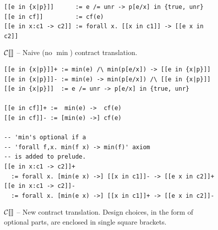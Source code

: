 \documentclass[preprint]{sigplanconf}
\begin{document}
\begin{figure}
\begin{verbatim}
[[e in {x|p}]]      := e /= unr -> p[e/x] in {true, unr}
[[e in cf]]         := cf(e)
[[e in x:c1 -> c2]] := forall x. [[x in c1]] -> [[e x in c2]]
\end{verbatim}
\caption{$\mathcal{C} \llbracket  \rrbracket$ -- Naive (no $\min$) contract translation.}
\label{fig:naiveCTrans}
\end{figure}

\begin{figure}
\begin{verbatim}
[[e in {x|p}]]+ := min(e) /\ min(p[e/x]) -> [[e in {x|p}]]
[[e in {x|p}]]- := min(e) -> min(p[e/x]) /\ [[e in {x|p}]]
[[e in {x|p}]]  := e /= unr -> p[e/x] in {true, unr}

[[e in cf]]+ :=  min(e) ->  cf(e)
[[e in cf]]- := [min(e) ->] cf(e)

-- 'min's optional if a
-- 'forall f,x. min(f x) -> min(f)' axiom
-- is added to prelude.
[[e in x:c1 -> c2]]+
  := forall x. [min(e x) ->] [[x in c1]]- -> [[e x in c2]]+   
[[e in x:c1 -> c2]]-
  := forall x. [min(e x) ->] [[x in c1]]+ -> [[e x in c2]]-
\end{verbatim}
\caption{$\mathcal{C} \llbracket  \rrbracket$ -- New contract translation. Design choices, in the form
of optional parts, are enclosed in single square brackets.}
\label{fig:newCTrans}
\end{figure}
\end{document}
